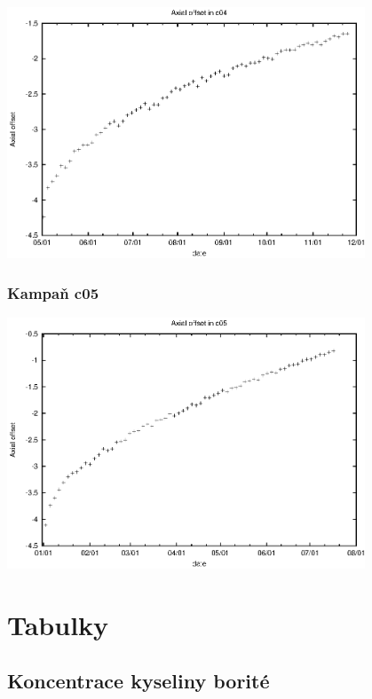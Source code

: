 \documentclass[a4paper,twoside,11pt]{article}
\begin{document}
\begin{center}
\includegraphics[width=0.8\textwidth]{ao_c04.eps}
\end{center}




\subsubsection{Kampaň c05}

\begin{center}
\includegraphics[width=0.8\textwidth]{ao_c05.eps}
\end{center}


\section{Tabulky}

\subsection{Koncentrace kyseliny borité}
\end{document}
